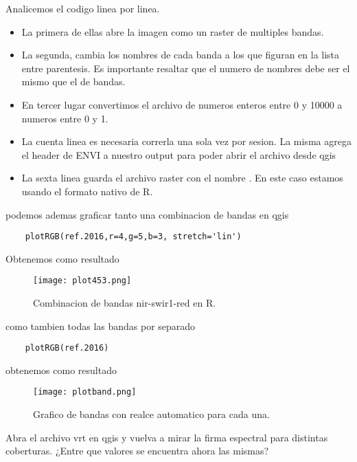 \begin{exa}
    Analicemos el codigo linea por linea.
    \begin{itemize}
    \item La primera de ellas abre la imagen como  un raster de multiples bandas.
    \item La segunda, cambia los nombres de cada banda a los que figuran en la
          lista entre parentesis. Es importante resaltar que el numero de nombres
          debe ser el mismo que el de bandas.
    \item En tercer lugar convertimos el archivo de numeros enteros entre 0 y
          10000 a numeros entre 0 y 1.
    \item La cuenta linea es necesaria correrla una sola vez por sesion. La misma
          agrega el header de ENVI a nuestro output para poder abrir el archivo
          desde qgis
      \item La sexta linea guarda el archivo raster con el nombre 
          . En este caso estamos usando el formato nativo de R.
    \end{itemize}
    podemos ademas graficar tanto una combinacion de bandas en qgis
    \begin{lstlisting}
    plotRGB(ref.2016,r=4,g=5,b=3, stretch='lin')
    \end{lstlisting}
    Obtenemos como resultado
    \begin{figure}[h!]
    \begin{center}
        \texttt{[image: plot453.png]}
    \end{center}
    \caption{Combinacion de bandas nir-swir1-red en R.}
    \label{fig:}
    \end{figure}
    como tambien todas las bandas por separado
    \begin{lstlisting}
    plotRGB(ref.2016)
    \end{lstlisting}
    obtenemos como resultado
    \begin{figure}[h!]
    \begin{center}
        \texttt{[image: plotband.png]}
    \end{center}
    \caption{Grafico de bandas con realce automatico para cada una.}
    \label{fig:plotband}
    \end{figure}

\end{exa}

\begin{act}
   Abra el archivo vrt en qgis y vuelva a mirar la firma espectral para
   distintas coberturas. ¿Entre que valores se encuentra ahora las mismas?
\end{act}

